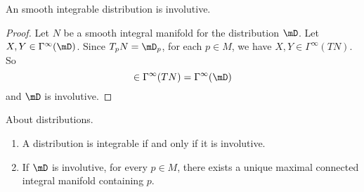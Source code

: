 \begin{proposition}
    An smooth integrable distribution is involutive.
\end{proposition}

\begin{proof}
    Let \( N\) be a smooth integral manifold for the distribution \( \mD\).  Let \( X,Y\in\Gamma^{\infty}(\mD)\). Since \( T_pN=\mD_p\), for each \( p\in M\), we have \( X,Y\in\Gamma^{\infty}(TN)\). So
    \begin{equation}
        [X,Y]\in\Gamma^{\infty}(TN)=\Gamma^{\infty}(\mD)
    \end{equation}
    and \( \mD\) is involutive.
\end{proof}

\begin{theorem}      \label{THOooVRDYooIusxwW}
    About distributions.
    \begin{enumerate}
        \item
            A distribution is integrable if and only if it is involutive.
        \item
            If \( \mD\) is involutive, for every \( p\in M\), there exists a unique maximal connected integral manifold containing \( p\).
    \end{enumerate}
\end{theorem}
